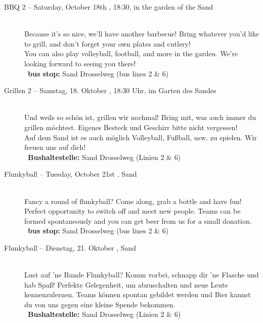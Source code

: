 \begin{description}

\ifml
    \item[BBQ 2 -- Saturday, October 18th \YEAR, 18:30, in the garden of the Sand]~\\
    Because it's so nice, we'll have another barbecue!
    Bring whatever you'd like to grill, and don’t forget your own plates and cutlery!\\
    You can also play volleyball, football, and more in the garden. We’re looking forward to seeing you there!\\
    ~\textbf{bus stop:} Sand Drosselweg (bus lines 2 \& 6)
\else
    \item[Grillen 2 -- Samstag, 18. Oktober \YEAR, 18:30 Uhr, im Garten des Sandes]~\\
    Und weils so schön ist, grillen wir nochmal!
    Bring mit, was auch immer du grillen möchtest. Eigenes Besteck und Geschirr bitte nicht vergessen!\\
    Auf dem Sand ist es auch möglich Volleyball, Fußball, usw. zu spielen. Wir freuen uns auf dich!\\
    ~\textbf{Bushaltestelle:} Sand Drosselweg (Linien 2 \& 6)
\fi

\ifml
	\item[Flunkyball -- Tuesday, October 21st \YEAR, Sand]~\\
	Fancy a round of flunkyball? Come along, grab a bottle and have fun!
	Perfect opportunity to switch off and meet new people.
	Teams can be formed spontaneously and you can get beer from us for a small donation.\\
	~\textbf{bus stop:} Sand Drosselweg (bus lines 2 \& 6)
\else
	\item[Flunkyball -- Dienstag, 21. Oktober \YEAR, Sand]~\\
	Lust auf 'ne Runde Flunkyball? Komm vorbei, schnapp dir 'ne Flasche und hab Spaß!
	Perfekte Gelegenheit, um abzuschalten und neue Leute kennenzulernen.
	Teams können spontan gebildet werden und Bier kannst du von uns gegen eine kleine Spende bekommen.\\
    ~\textbf{Bushaltestelle:} Sand Drosselweg (Linien 2 \& 6)
\fi


\end{description}
